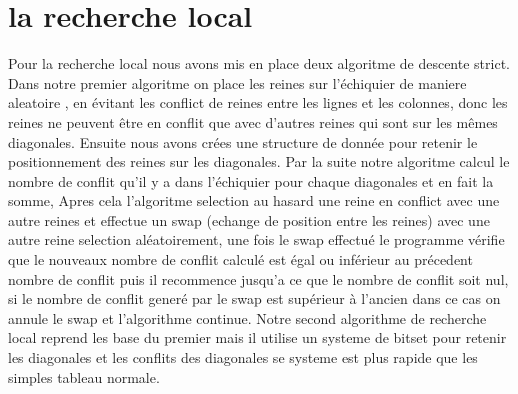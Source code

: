 \section{la recherche local}

Pour la recherche local nous avons mis en place deux algoritme de descente strict.
Dans notre premier algoritme on place les reines sur l'échiquier de maniere aleatoire , en évitant les conflict de reines entre les lignes et les colonnes, donc les reines ne peuvent être en conflit que avec d'autres reines qui sont sur les mêmes diagonales.
Ensuite nous avons crées une structure de donnée pour retenir le positionnement des reines sur les diagonales. %
Par la suite notre algoritme calcul le nombre de conflit qu'il y a dans l'échiquier pour chaque diagonales et en fait la somme, Apres cela l'algoritme selection au hasard une reine en conflict avec une autre reines et effectue un swap (echange de position entre les reines) avec une autre reine selection aléatoirement, une fois le swap effectué le programme vérifie que le nouveaux nombre de conflit calculé est égal ou inférieur au précedent nombre de conflit puis il recommence jusqu'a ce que le nombre de conflit soit nul, si le nombre de conflit generé par le swap est supérieur à l'ancien dans ce cas on annule le swap et l'algorithme continue.  
Notre second algorithme de recherche local reprend les base du premier mais il utilise un systeme de bitset pour retenir les diagonales et les conflits des diagonales se systeme est plus rapide que les simples tableau normale.  